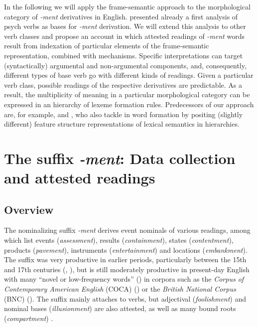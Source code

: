 \documentclass[output=paper]{langsci/langscibook}
\begin{document}
In the following we will apply the frame-semantic approach to the morphological category of \textit{-ment} derivatives in English. \citet{Kawaletz.2015} presented already a first analysis of psych verbs as bases for \textit{-ment} derivation. We will extend this analysis to other verb classes and propose an account in which attested readings of \textit{-ment} words result from indexation of particular elements of the frame-semantic representation, combined with  mechanisms. Specific interpretations can target (syntactically) argumental and non-argumental components, and, consequently, different types of base verb go  with different kinds of readings. Given a particular verb class, possible readings of the respective derivatives are predictable. As a result, the multiplicity of meaning in a particular morphological category can be expressed in an  hierarchy of lexeme formation rules. Predecessors of our approach are, for example, \citet{Desmets.2009} and \citet{Tribout.2010}, who also tackle  in word formation by positing (slightly different) feature structure representations of lexical semantics in  hierarchies.


\section{The suffix \textit{-ment}: Data collection and attested readings}

\subsection{Overview}

The nominalizing suffix \textit{-ment} derives event nominals of various readings, among which  \citet[chapter 10]{Bauer.2013} list events (\textit{assessment}), results (\textit{containment}), states (\textit{contentment}), products (\textit{pavement}), instruments (\textit{entertainment}) and locations (\textit{embankment}). The suffix  was very productive in earlier periods, particularly between the 15th and 17th centuries (\citealt{Marchand.1969}, \citealt{Lindsay2013}), but is still moderately productive in present-day English with many ``novel or low-frequency words'' (\citealt[199]{Bauer.2013}) in corpora such as the  \textit{Corpus of Contemporary American English} (COCA) (\citealt{Davies.2008}) or the \textit{British National Corpus} (BNC) (\citealt{Burnard.1995}). The suffix mainly attaches to verbs, but adjectival (\textit{foolishment}) and nominal bases (\textit{illusionment}) are also attested, as well as many bound roots (\textit{compartment}) \citep[198]{Bauer.2013}.
\end{document}
